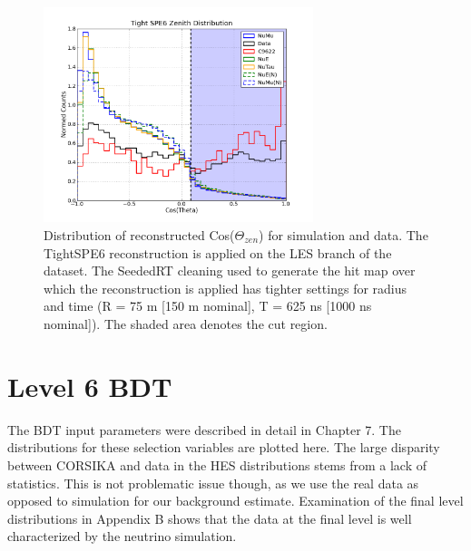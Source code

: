 \documentclass{gatech-thesis}
\begin{document}
\begin{figure}
  \begin{center}
    \includegraphics[width=0.70\textwidth,keepaspectratio]{LES_TightSPE6ZenithDistribution_L5.png}
  \end{center}
  \caption[L5 TightSPE6 Reconstruction Zenith Distribution]{Distribution of reconstructed Cos($\Theta_{zen}$) for simulation and data. The TightSPE6 reconstruction is applied on the LES branch of the dataset. The SeededRT cleaning used to generate the hit map over which the reconstruction is applied has tighter settings for radius and time (R = 75 m [150 m nominal], T = 625 ns [1000 ns nominal]). The shaded area denotes the cut region.}
  \label{fig:LES_TightSPE6Reco}
\end{figure}
\pagebreak

\section{Level 6 BDT}
The BDT input parameters were described in detail in Chapter 7. The distributions for these selection variables are plotted here. The large disparity between CORSIKA and data in the HES distributions stems from a lack of statistics. This is not problematic issue though, as we use the real data as opposed to simulation for our background estimate. Examination of the final level distributions in Appendix B shows that the data at the final level is well characterized by the neutrino simulation.
\end{document}
